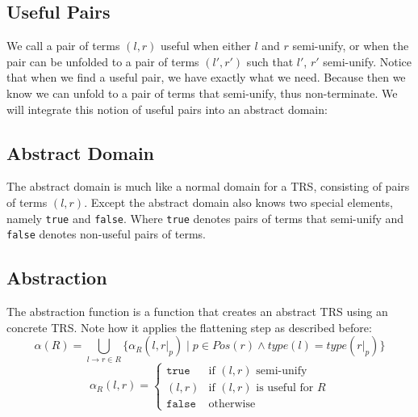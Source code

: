 \subsection*{Useful Pairs}
We call a pair of terms $(l, r)$ useful when either $l$ and $r$ semi-unify, or when the pair can be unfolded to a pair of terms $(l', r')$ such that $l'$, $r'$ semi-unify. Notice that when we find a useful pair, we have exactly what we need. Because then we know we can unfold to a pair of terms that semi-unify, thus non-terminate. We will integrate this notion of useful pairs into an abstract domain:

\subsection*{Abstract Domain}
The abstract domain is much like a normal domain for a TRS, consisting of pairs of terms $(l, r)$. Except the abstract domain also knows two special elements, namely \texttt{true} and \texttt{false}. Where \texttt{true} denotes pairs of terms that semi-unify and \texttt{false} denotes non-useful pairs of terms.

\subsection*{Abstraction}
The abstraction function is a function that creates an abstract TRS using an concrete TRS. Note how it applies the flattening step as described before: 
\[
\alpha(R) = \bigcup\limits_{l \rightarrow r \in R} \{\alpha_R(l, \left.r\right|_p) \mid p \in \textit{Pos}(r) \land \textit{type}(l) = \textit{type}(\left.r\right|_p)\} 
\]
\[
\alpha_R(l, r) =
\left\{
    \begin{array}{ll}
        \texttt{true} & \text{if } (l, r) \text{ semi-unify}\\
        (l, r) & \text{if } (l, r) \text{ is useful for } R\\
        \texttt{false} & \text{otherwise}
    \end{array}
\right.
\]

